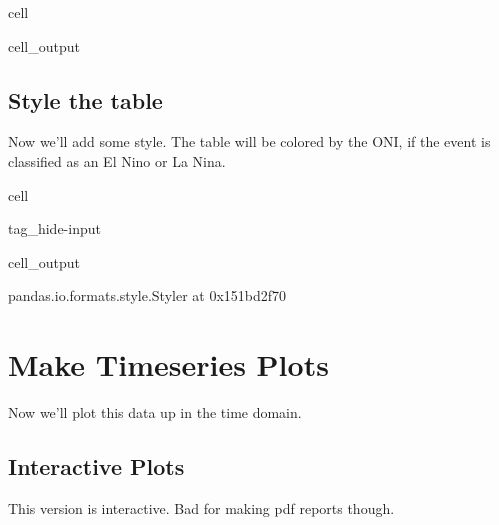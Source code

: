 \documentclass[letterpaper,10pt,english]{jupyterBook}
\begin{document}
\begin{sphinxuseclass}{cell}
\begin{sphinxVerbatimOutput}
\begin{sphinxuseclass}{cell_output}
\end{sphinxuseclass}\end{sphinxVerbatimOutput}

\end{sphinxuseclass}

\section{Style the table}
\label{\detokenize{notebooks/regional_and_local/SL_Rankings_annual:style-the-table}}\label{\detokenize{notebooks/regional_and_local/SL_Rankings_annual:sl-rankings-results}}
\sphinxAtStartPar
Now we’ll add some style. The table will be colored by the ONI, if the event is classified as an El Nino or La Nina.

\begin{sphinxuseclass}{cell}
\begin{sphinxuseclass}{tag_hide-input}\begin{sphinxVerbatimOutput}

\begin{sphinxuseclass}{cell_output}
\begin{sphinxVerbatim}[commandchars=\\\{\}]
\PYGZlt{}pandas.io.formats.style.Styler at 0x151bd2f70\PYGZgt{}
\end{sphinxVerbatim}

\end{sphinxuseclass}\end{sphinxVerbatimOutput}

\end{sphinxuseclass}
\end{sphinxuseclass}

\chapter{Make Timeseries Plots}
\label{\detokenize{notebooks/regional_and_local/SL_Rankings_annual:make-timeseries-plots}}\label{\detokenize{notebooks/regional_and_local/SL_Rankings_annual:sl-rankings-timeseries}}
\sphinxAtStartPar
Now we’ll plot this data up in the time domain.


\section{Interactive Plots}
\label{\detokenize{notebooks/regional_and_local/SL_Rankings_annual:interactive-plots}}
\sphinxAtStartPar
This version is interactive. Bad for making pdf reports though.
\end{document}
